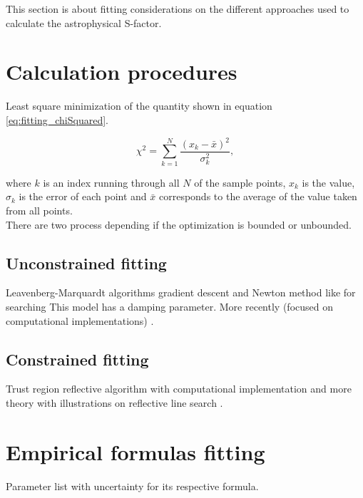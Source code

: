 \documentclass[openany]{book}
\begin{document}
This section is about fitting considerations on the different approaches used to calculate the astrophysical S-factor.

\section{Calculation procedures} \label{sec:calculationFitting}

Least square minimization of the quantity shown in equation \ref{eq:fitting_chiSquared}.

\begin{equation} \label{eq:fitting_chiSquared}
	\chi^2  = \sum_{k=1}^{N} {\frac{(x_k - \bar x)^2}{\sigma_k^2} },
\end{equation}

where $k$ is an index running through all $N$ of the sample points, $x_k$ is the value, $\sigma_k$ is the error of each point and $\bar x$ corresponds to the average of the value taken from all points.\\

There are two process depending if the optimization is bounded or unbounded.

\subsection{Unconstrained fitting} \label{sub:unconstrainedFitting}

Leavenberg-Marquardt algorithms \cite{watson_more_1978} gradient descent and Newton method like for searching This model has a damping parameter. More recently (focused on computational implementations) \cite{ramadasan_chevaldonne_chateau_2017}.

\subsection{Constrained fitting} \label{sub:constrainedFitting}

Trust region reflective algorithm with computational implementation \cite{branch_coleman_li_1999} and more theory with illustrations on reflective line search \cite{coleman_li_1994}.

\section{Empirical formulas fitting} \label{sec:empiricalFitting}

Parameter list with uncertainty for its respective formula.  \\
\end{document}
